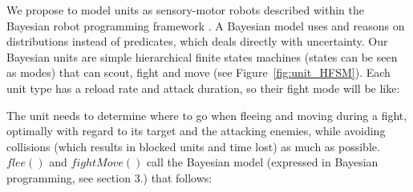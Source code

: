 We propose to model units as sensory-motor robots described within the Bayesian robot programming framework \citep{Lebeltel04}. A Bayesian model uses and reasons on distributions instead of predicates, which deals directly with uncertainty. %
Our Bayesian units are simple hierarchical finite states machines (states can be seen as modes) that can scout, fight and move (see Figure~\ref{fig:unit_HFSM}). Each unit type has a reload rate and attack duration, so their fight mode will be like:
\begin{algorithmic}
\Else
\EndIf
\end{algorithmic}
The unit needs to determine where to go when fleeing and moving during a fight, optimally with regard to its target and the attacking enemies, while avoiding collisions (which results in blocked units and time lost) as much as possible. $flee()$ and $fightMove()$ call the Bayesian model (expressed in Bayesian programming, see section 3.) that follows:
